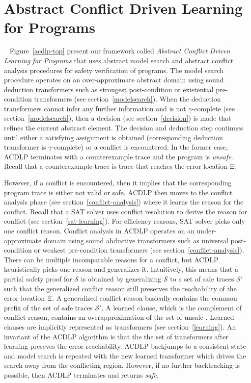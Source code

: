 \section{Abstract Conflict Driven Learning for Programs}~\label{acdlp}
%
Figure~\ref{acdlp-top} present our framework called \emph{Abstract Conflict 
Driven Learning for Programs} that uses abstract model search and abstract 
conflict analysis procedures for safety verification of programs.  The model
search procedure operates on an over-approximate abstract domain using sound deduction 
transformers such as strongest post-condition or existential pre-condition 
transformers (see section~\ref{modelsearch}).  When the deduction transformers cannot 
infer any further information and is not $\gamma$-complete (see 
section~\ref{modelsearch}), then a decision (see section~\ref{decision}) is made  
that refines the current abstract element.  The decision and deduction step continues 
until either a satisfying assignment is obtained (corresponding deduction transformer 
is $\gamma$-complete) or a conflict is encountered. In the former case, ACDLP terminates 
with a counterexample trace and the program is \emph{unsafe}. Recall that a counterexample 
trace is trace that reaches the error location $\Xi$. 

However, if a conflict is encountered, then it implies that the corresponding 
program trace is either not valid or safe.  ACDLP then moves to the conflict 
analysis phase (see section~\ref{conflict-analysis}) where it learns the 
reason for the conflict.  Recall that a SAT solver uses conflict resolution to derive 
the reason for conflict (see section~\ref{sat-learning}).  For efficiency 
reasons, SAT solver picks only one conflict reason.  Conflict analysis 
in ACDLP operates on an under-approximate domain using sound abductive transformers 
such as universal post-condition or weakest pre-condition transformers 
(see section~\ref{conflict-analysis}).  There can be multiple incomparable 
reasons for a conflict, but ACDLP heuristically picks one reason and generalizes it. 
Intuitively, this means that a partial safety proof for $\mathcal{S}$ is obtained 
by generalizing $\mathcal{S}$ to a set of safe  traces 
$\mathcal{S'}$ such that the generalized conflict reason still preserves the 
reachability of the error location $\Xi$.  A generalized conflict reason basically 
contains the common prefix of the set of safe traces $\mathcal{S'}$. A learned clause, 
which is the complement of conflict reason, contains an overapproximation of the set of 
unsafe .  Learned clauses are implicitly represented as 
transformers (see section~\ref{learning}).  An invariant of the ACDLP algorithm is 
that the the set of transformers after learning preseves the error reachability. 
ACDLP backjumps to a consistent state and model search is repeated with the new 
learned transformer which drives the search away from the conflicting region.  
However, if no further backtracking is possible, then ACDLP terminates and 
returns \emph{safe}.  


